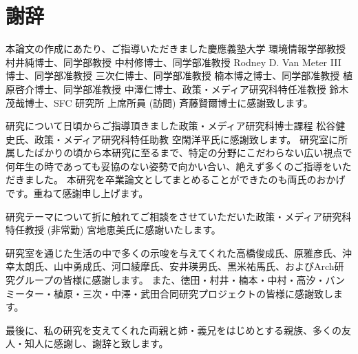 \chapter*{謝辞}
\label{thanks}

本論文の作成にあたり、ご指導いただきました慶應義塾大学 環境情報学部教授 村井純博士、同学部教授 中村修博士、同学部准教授 Rodney D. Van Meter III 博士、同学部准教授 三次仁博士、同学部准教授 楠本博之博士、同学部准教授 植原啓介博士、同学部准教授 中澤仁博士、政策・メディア研究科特任准教授 鈴木茂哉博士、SFC 研究所 上席所員 (訪問) 斉藤賢爾博士に感謝致します。

研究について日頃からご指導頂きました政策・メディア研究科博士課程 松谷健史氏、政策・メディア研究科特任助教 空閑洋平氏に感謝致します。
研究室に所属したばかりの頃から本研究に至るまで、特定の分野にこだわらない広い視点で何年生の時であっても妥協のない姿勢で向かい合い、絶えず多くのご指導をいただきました。
本研究を卒業論文としてまとめることができたのも両氏のおかげです。重ねて感謝申し上げます。

研究テーマについて折に触れてご相談をさせていただいた政策・メディア研究科特任教授 (非常勤) 宮地恵美氏に感謝いたします。

研究室を通じた生活の中で多くの示唆を与えてくれた高橋俊成氏、原雅彦氏、沖幸太朗氏、山中勇成氏、河口綾摩氏、安井瑛男氏、黒米祐馬氏、およびArch研究グループの皆様に感謝します。
また、徳田・村井・楠本・中村・高汐・バンミーター・植原・三次・中澤・武田合同研究プロジェクトの皆様に感謝致します。

最後に、私の研究を支えてくれた両親と姉・義兄をはじめとする親族、多くの友人・知人に感謝し、謝辞と致します。

